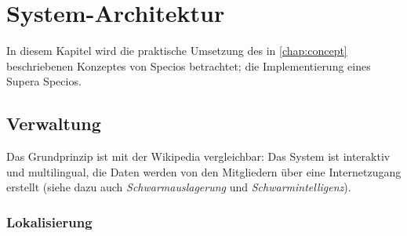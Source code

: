\chapter{System-Architektur}\label{chap:architecture}

In diesem Kapitel wird die praktische Umsetzung des in \vref{chap:concept} beschriebenen Konzeptes von Specios betrachtet; die Implementierung eines Supera Specios.

\section{Verwaltung}\label{sec:maintenance}

Das Grundprinzip ist mit der Wikipedia vergleichbar: Das System ist interaktiv und multilingual, die Daten werden von den Mitgliedern über eine Internetzugang erstellt (siehe dazu auch \textit{Schwarmauslagerung} und \textit{Schwarmintelligenz}).

\subsection{Lokalisierung}\label{sec:maintenance/localization}

